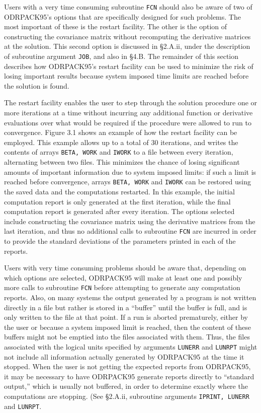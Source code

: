 \noindent Users with a very time consuming subroutine {\tt FCN} should also be
aware of two of ODRPACK95's options that are specifically designed for such
problems. The most important of these is the restart facility. The other is the
option of constructing the covariance matrix without recomputing the derivative
matrices at the solution. This second option is discussed in \S 2.A.ii, under
the description of subroutine argument {\tt JOB}, and also in \S 4.B. The
remainder of this section describes how ODRPACK95's restart facility can be used to minimize the risk of losing important results because system imposed time limits are reached before the solution is found.

\noindent The restart facility enables the user to step through the solution procedure one or more iterations at a time without incurring any additional function or derivative evaluations over what would be required if the procedure were allowed to run to convergence. Figure 3.1 shows an example of how the restart facility can be employed. This example allows up to a total of 30 iterations, and writes the contents of arrays {\tt BETA, WORK} and {\tt IWORK} to a file between every iteration, alternating between two files. This minimizes the chance of losing significant amounts of important information due to system imposed limits: if such a limit is reached before convergence, arrays {\tt BETA, WORK} and {\tt IWORK} can be restored using the saved data and the computations restarted. In this example, the initial computation report is only generated at the first iteration, while the final computation report is generated after every iteration. The options selected include constructing the covariance matrix using the derivative matrices from the last iteration, and thus no additional calls to subroutine {\tt FCN} are incurred in order to provide the standard deviations of the parameters printed in each of the reports.

\noindent Users with very time consuming problems should be aware that,
depending on which options are selected, ODRPACK95 will make at least one and
possibly more calls to subroutine {\tt FCN} before attempting to generate any
computation reports. Also, on many systems the output generated by a program is
not written directly in a file but rather is stored in a ``buffer'' until the
buffer is full, and is only written to the file at that point. If a run is
aborted prematurely, either by the user or because a system imposed limit is
reached, then the content of these buffers might not be emptied into the files
associated with them. Thus, the files associated with the logical units
specified by arguments {\tt LUNERR} and {\tt LUNRPT} might not include all
information actually generated by ODRPACK95 at the time it stopped. When the
user is not getting the expected reports from ODRPACK95, it may be necessary to
have ODRPACK95 generate reports directly to ``standard output,'' which is usually not buffered, in order to determine exactly where the computations are stopping. (See \S 2.A.ii, subroutine arguments {\tt IPRINT, LUNERR} and {\tt LUNRPT}.

